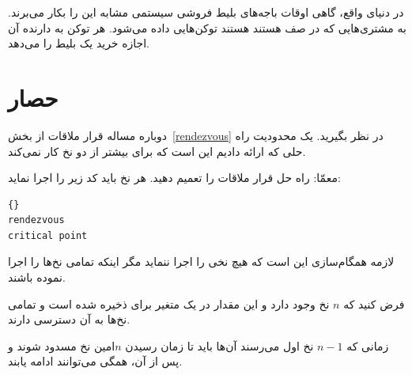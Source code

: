 \documentclass{book}
\begin{document}
    در دنیای واقع، گاهی  اوقات باجه‌های بلیط فروشی سیستمی مشابه این را بکار می‌برند. 
    به مشتری‌هایی که در صف هستند هستند توکن‌هایی داده می‌شود. هر توکن به دارنده آن اجازه خرید یک بلیط را می‌دهد. 



\section{حصار}

    دوباره مساله قرار ملاقات از بخش~\ref{rendezvous} در نظر بگیرید. 
    یک محدودیت راه حلی که ارائه دادیم این است که برای بیشتر از دو نخ کار نمی‌کند. 

    معمّا: راه حل قرار ملاقات را تعمیم دهید. هر نخ باید کد زیر را اجرا نماید:
\begin{latin}
\begin{latin}
\begin{lstlisting}[title=\rl{ کد حصار}]{}
rendezvous
critical point
\end{lstlisting}
\end{latin}
\end{latin}

    لازمه همگام‌سازی این است که هیچ نخی  را اجرا ننماید مگر اینکه تمامی نخ‌ها 
    را اجرا نموده باشند. 

    فرض کنید که $n$ نخ وجود دارد و این مقدار در یک متغیر برای    ذخیره  شده است و تمامی نخ‌ها به آن دسترسی دارند. 

    زمانی که $n-1$ نخ اول می‌رسند آن‌ها باید تا زمان رسیدن $n$‌امین نخ مسدود شوند و پس از %
    آن، همگی می‌توانند ادامه یابند. 
\end{document}
